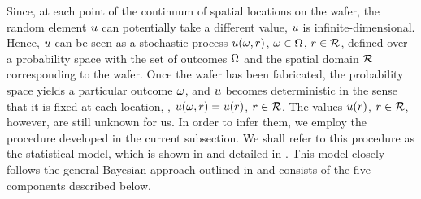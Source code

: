 
Since, at each point of the continuum of spatial locations on the wafer, the random element $u$ can potentially take a different value, $u$ is infinite-dimensional.
Hence, $u$ can be seen as a stochastic process $u(\omega, r)$, $\omega \in \Omega$, $r \in \mathcal{R}$, defined over a probability space with the set of outcomes $\Omega$ \cite{durrett2010} and the spatial domain $\mathcal{R}$ corresponding to the wafer.
Once the wafer has been fabricated, the probability space yields a particular outcome $\omega$, and $u$ becomes deterministic in the sense that it is fixed at each location, \ie, $u(\omega, r) = u(r)$, $r \in \mathcal{R}$.
The values $u(r)$, $r \in \mathcal{R}$, however, are still unknown for us.
In order to infer them, we employ the procedure developed in the current subsection. We shall refer to this procedure as the statistical model, which is shown in  and detailed in . This model closely follows the general Bayesian approach outlined in  and consists of the five components described below.

